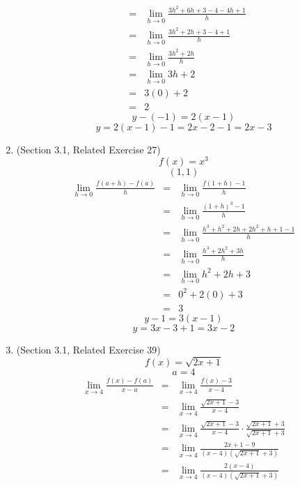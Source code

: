 \documentclass{article}
\begin{document}
\begin{enumerate}
\begin{eqnarray}
                                                &=& \lim_{h \to 0}{\frac{3h^2 + 6h + 3 - 4 - 4h +1}{h}} \\
                                                &=& \lim_{h \to 0}{\frac{3h^2 + 2h + 3 - 4 + 1}{h}} \\
                                                &=& \lim_{h \to 0}{\frac{3h^2 + 2h}{h}} \\
                                                &=& \lim_{h \to 0}{3h + 2} \\
                                                &=& 3(0) + 2 \\
                                                &=& 2
    \end{eqnarray}
    $$y - (-1) = 2(x - 1)$$
    $$y = 2(x - 1) - 1 = 2x - 2 - 1 = 2x - 3$$
    \item (Section 3.1, Related Exercise 27)
    $$f(x) = x^3$$
    $$(1, 1)$$
    \begin{eqnarray}
        \lim_{h \to 0}{\frac{f(a + h) - f(a)}{h}} &=& \lim_{h \to 0}{\frac{f(1 + h) - 1}{h}} \\
        &=& \lim_{h \to 0}{\frac{(1 + h)^3 - 1}{h}} \\
        &=& \lim_{h \to 0}{\frac{h^3 + h^2 + 2h + 2h^2 + h + 1 - 1}{h}} \\
        &=& \lim_{h \to 0}{\frac{h^3 + 2h^2 + 3h}{h}} \\
        &=& \lim_{h \to 0}{h^2 + 2h + 3} \\
        &=& 0^2 + 2(0) + 3 \\
        &=& 3
    \end{eqnarray}
    $$y - 1 = 3(x - 1)$$
    $$y = 3x - 3 + 1 = 3x - 2$$
    \item (Section 3.1, Related Exercise 39)
    $$f(x) = \sqrt{2x+1}$$
    $$a = 4$$
    \begin{eqnarray}
        \lim_{x \to 4}{\frac{f(x) - f(a)}{x - a}} &=& \lim_{x \to 4}{\frac{f(x) - 3}{x - 4}} \\
                                                &=& \lim_{x \to 4}{\frac{\sqrt{2x + 1} - 3}{x - 4}} \\
                                                &=& \lim_{x \to 4}{\frac{\sqrt{2x + 1} - 3}{x - 4} \cdot \frac{\sqrt{2x + 1} + 3}{\sqrt{2x + 1} + 3}} \\
                                                &=& \lim_{x \to 4}{\frac{2x + 1 - 9}{(x - 4)(\sqrt{2x + 1} + 3)}} \\
                                                &=& \lim_{x \to 4}{\frac{2(x - 4)}{(x - 4)(\sqrt{2x + 1} + 3)}} \\

\end{eqnarray}
\end{enumerate}
\end{document}
